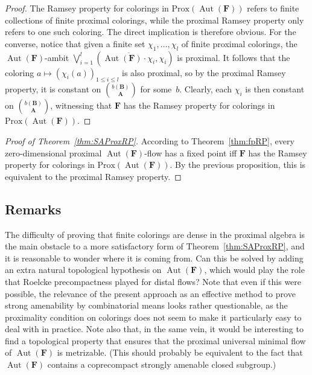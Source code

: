 \documentclass[11pt]{article}
\theoremstyle{definition}
\numberwithin{equation}{section}
\numberwithin{figure}{section}
\numberwithin{table}{section}
\newcommand*{\mA}{\mathbf{A}}
\newcommand*{\mB}{\mathbf{B}}
\newcommand*{\mF}{\mathbf{F}}
\DeclareMathOperator{\Aut}{Aut}
\begin{document}
\begin{proof}
The Ramsey property for colorings in $\mathrm{Prox}(\Aut(\mF))$ refers to finite collections of finite proximal colorings, while the proximal Ramsey property only refers to one such coloring. The direct implication is therefore obvious. For the converse, notice that given a finite set $\chi_{1},\ldots,\chi_{l}$ of finite proximal colorings, the $\Aut(\mF)$-ambit $\bigvee_{i=1}^{l} (\overline{\Aut(\mF)\cdot\chi_{i}},\chi_{i})$ is proximal. It follows that the coloring $a\mapsto (\chi_{i}(a))_{1\leq i\leq l}$ is also proximal, so by the proximal Ramsey property, it is constant on $\binom{b(\mB)}{\mA}$ for some~$b$. Clearly, each $\chi_{i}$ is then constant on $\binom{b(\mB)}{\mA}$, witnessing that $\mF$ has the Ramsey property for colorings in $\mathrm{Prox}(\Aut(\mF))$.
\end{proof}

\begin{proof}[Proof of Theorem~\ref{thm:SAProxRP}]
According to Theorem~\ref{thm:fpRP}, every zero-dimensional proximal $\Aut(\mF)$-flow has a fixed point iff $\mF$ has the Ramsey property for colorings in $\mathrm{Prox}(\Aut(\mF))$. By the previous proposition, this is equivalent to the proximal Ramsey property.
\end{proof}


\subsection{Remarks}
\label{subsection:RksProx}

The difficulty of proving that finite colorings are dense in the proximal algebra is the main obstacle to a more satisfactory form of Theorem~\ref{thm:SAProxRP}, and it is reasonable to wonder where it is coming from. Can this be solved by adding an extra natural topological hypothesis on $\Aut(\mF)$, which would play the role that Roelcke precompactness played for distal flows? Note that even if this were possible, the relevance of the present approach as an effective method to prove strong amenability by combinatorial means looks rather questionable, as the proximality condition on colorings does not seem to make it particularly easy to deal with in practice. Note also that, in the same vein, it would be interesting to find a topological property that ensures that the proximal universal minimal flow of $\Aut(\mF)$ is metrizable. (This should probably be equivalent to the fact that $\Aut(\mF)$ contains a coprecompact strongly amenable closed subgroup.)
\end{document}
